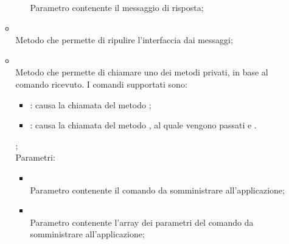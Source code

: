 \begin{itemize}
\begin{itemize}
\begin{itemize}
			Parametro contenente il messaggio di risposta;
		\end{itemize}
		\item[]  \\
		Metodo che permette di ripulire l'interfaccia dai messaggi;\\
		\item[]  \\
		Metodo che permette di chiamare uno dei metodi privati, in base al comando ricevuto.
I comandi supportati sono:
\begin{itemize}
   \item {}: causa la chiamata del metodo ;
   \item {}: causa la chiamata del metodo , al quale vengono passati  e .
\end{itemize}
;\\
		Parametri:
		\begin{itemize}
			\item {} \\
			Parametro contenente il comando da somministrare all'applicazione;
			\item {} \\
			Parametro contenente l'array dei parametri del comando da somministrare all'applicazione;
		\end{itemize}
	\end{itemize}
\end{itemize}


